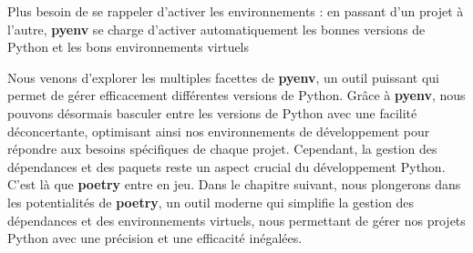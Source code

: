 Plus besoin de se rappeler d'activer les environnements : en passant d'un projet à l'autre, \textbf{pyenv} se charge d'activer automatiquement les bonnes versions de Python et les bons environnements virtuels
\bigskip

\begin{center}
\end{center}

Nous venons d'explorer les multiples facettes de \textbf{pyenv}, un outil puissant qui permet de gérer efficacement différentes versions de Python. Grâce à \textbf{pyenv}, nous pouvons désormais basculer entre les versions de Python avec une facilité déconcertante, optimisant ainsi nos environnements de développement pour répondre aux besoins spécifiques de chaque projet. Cependant, la gestion des dépendances et des paquets reste un aspect crucial du développement Python. C'est là que \textbf{poetry} entre en jeu. Dans le chapitre suivant, nous plongerons dans les potentialités de \textbf{poetry}, un outil moderne qui simplifie la gestion des dépendances et des environnements virtuels, nous permettant de gérer nos projets Python avec une précision et une efficacité inégalées.

